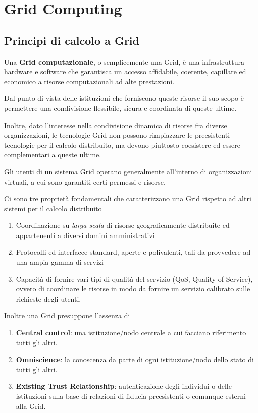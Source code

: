 \documentclass[italian,]{article}
\providecommand{\tightlist}{%
  \setlength{\itemsep}{0pt}\setlength{\parskip}{0pt}}
\begin{document}
\section{Grid Computing}\label{grid-computing}

\subsection{Principi di calcolo a
Grid}\label{principi-di-calcolo-a-grid}

Una \textbf{Grid computazionale}, o semplicemente una Grid, è una
infrastruttura hardware e software che garantisca un accesso affidabile,
coerente, capillare ed economico a risorse computazionali ad alte
prestazioni.

Dal punto di vista delle istituzioni che forniscono queste risorse il
suo scopo è permettere una condivisione flessibile, sicura e coordinata
di queste ultime.

Inoltre, dato l'interesse nella condivisione dinamica di risorse fra
diverse organizzazioni, le tecnologie Grid non possono rimpiazzare le
preesistenti tecnologie per il calcolo distribuito, ma devono piuttosto
coesistere ed essere complementari a queste ultime.

Gli utenti di un sistema Grid operano generalmente all'interno di
organizzazioni virtuali, a cui sono garantiti certi permessi e risorse.

Ci sono tre proprietà fondamentali che caratterizzano una Grid rispetto
ad altri sistemi per il calcolo distribuito

\begin{enumerate}
\def\labelenumi{\arabic{enumi}.}
\tightlist
\item
  Coordinazione su \emph{larga scala} di risorse geograficamente
  distribuite ed appartenenti a diversi domini amministrativi
\item
  Protocolli ed interfacce standard, aperte e polivalenti, tali da
  provvedere ad una ampia gamma di servizi
\item
  Capacità di fornire vari tipi di qualità del servizio (QoS, Quality of
  Service), ovvero di coordinare le risorse in modo da fornire un
  servizio calibrato sulle richieste degli utenti.
\end{enumerate}

Inoltre una Grid presuppone l'assenza di

\begin{enumerate}
\def\labelenumi{\arabic{enumi}.}
\tightlist
\item
  \textbf{Central control}: una istituzione/nodo centrale a cui facciano
  riferimento tutti gli altri.
\item
  \textbf{Omniscience}: la conoscenza da parte di ogni istituzione/nodo
  dello stato di tutti gli altri.
\item
  \textbf{Existing Trust Relationship}: autenticazione degli individui o
  delle istituzioni sulla base di relazioni di fiducia preesistenti o
  comunque esterni alla Grid.
\end{enumerate}
\end{document}

